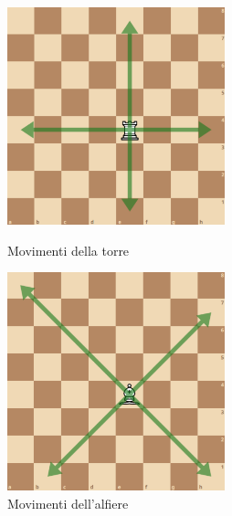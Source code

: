 \begin{figure}[!htb]
\begin{minipage}[b]{7cm}
\centering
\includegraphics[width=6.3cm]{frontmatter/figure/movimento_torre.pdf}
\caption{Movimenti della torre}
\label{fig:torre}
\end{minipage}
\hspace{1mm}
\begin{minipage}[b]{7cm}
\centering
\includegraphics[width=6.3cm]{frontmatter/figure/movimento_alfiere.pdf}
\caption{Movimenti dell'alfiere}
\label{fig:alfiere}
\end{minipage}
\end{figure}

